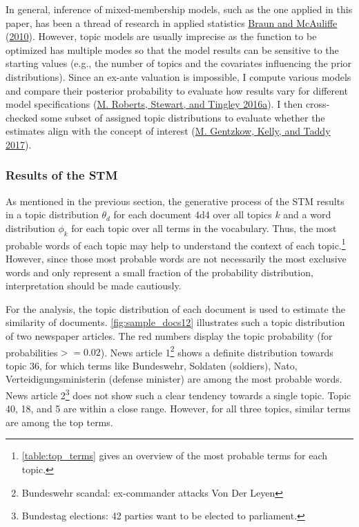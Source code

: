 \documentclass[
  12pt,
]{article}
\begin{document}
In general, inference of mixed-membership models, such as the one
applied in this paper, has been a thread of research in applied
statistics \protect\hyperlink{ref-braun_variational_2010}{Braun and
McAuliffe} (\protect\hyperlink{ref-braun_variational_2010}{2010}).
However, topic models are usually imprecise as the function to be
optimized has multiple modes so that the model results can be sensitive
to the starting values (e.g., the number of topics and the covariates
influencing the prior distributions). Since an ex-ante valuation is
impossible, I compute various models and compare their posterior
probability to evaluate how results vary for different model
specifications (\protect\hyperlink{ref-roberts_navigating_2016}{M.
Roberts, Stewart, and Tingley 2016a}). I then cross-checked some subset
of assigned topic distributions to evaluate whether the estimates align
with the concept of interest
(\protect\hyperlink{ref-gentzkow_text_2017}{M. Gentzkow, Kelly, and
Taddy 2017}).

\hypertarget{results-of-the-stm}{%
\subsubsection{Results of the STM}\label{results-of-the-stm}}

As mentioned in the previous section, the generative process of the STM
results in a topic distribution \(\theta_d\) for each document 4d4 over
all topics \(k\) and a word distribution \(\phi_k\) for each topic over
all terms in the vocabulary. Thus, the most probable words of each topic
may help to understand the context of each topic.\footnote{\autoref{table:top_terms}
  gives an overview of the most probable terms for each topic.} However,
since those most probable words are not necessarily the most exclusive
words and only represent a small fraction of the probability
distribution, interpretation should be made cautiously.

For the analysis, the topic distribution of each document is used to
estimate the similarity of documents. \autoref{fig:sample_docs12}
illustrates such a topic distribution of two newspaper articles. The red
numbers display the topic probability (for probabilities\(>= 0.02\)).
News article 1\footnote{Bundeswehr scandal: ex-commander attacks Von Der
  Leyen} shows a definite distribution towards topic 36, for which terms
like Bundeswehr, Soldaten (soldiers), Nato, Verteidigungsministerin
(defense minister) are among the most probable words. News article
2\footnote{Bundestag elections: 42 parties want to be elected to
  parliament.} does not show such a clear tendency towards a single
topic. Topic 40, 18, and 5 are within a close range. However, for all
three topics, similar terms are among the top terms.
\end{document}
